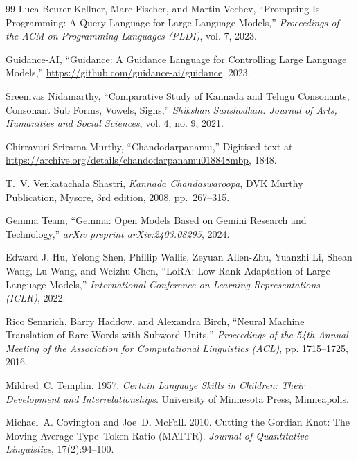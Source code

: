 \documentclass[11pt]{article}
\begin{document}
\begin{thebibliography}{99}
Luca Beurer-Kellner, Marc Fischer, and Martin Vechev, 
``Prompting Is Programming: A Query Language for Large Language Models,'' 
\textit{Proceedings of the ACM on Programming Languages (PLDI)}, vol. 7, 2023.

Guidance-AI, 
``Guidance: A Guidance Language for Controlling Large Language Models,'' 
\url{https://github.com/guidance-ai/guidance}, 2023.

Sreenivas Nidamarthy, 
``Comparative Study of {Kannada} and {Telugu} Consonants, Consonant Sub Forms, Vowels, Signs,'' 
\textit{Shikshan Sanshodhan: Journal of Arts, Humanities and Social Sciences}, vol. 4, no. 9, 2021.

Chirravuri Srirama Murthy,
``Chandodarpanamu,''
Digitised text at \url{https://archive.org/details/chandodarpanamu018848mbp}, 1848.

T.~V. Venkatachala Shastri,
\textit{Kannada Chandaswaroopa},
DVK Murthy Publication, Mysore, 3rd edition, 2008, pp.~267--315.

Gemma Team, 
``Gemma: Open Models Based on {Gemini} Research and Technology,'' 
\textit{arXiv preprint arXiv:2403.08295}, 2024.

Edward J. Hu, Yelong Shen, Phillip Wallis, Zeyuan Allen-Zhu, Yuanzhi Li, Shean Wang, Lu Wang, and Weizhu Chen, 
``{LoRA}: Low-Rank Adaptation of Large Language Models,'' 
\textit{International Conference on Learning Representations (ICLR)}, 2022.

Rico Sennrich, Barry Haddow, and Alexandra Birch,
``Neural Machine Translation of Rare Words with Subword Units,''
\textit{Proceedings of the 54th Annual Meeting of the Association for Computational Linguistics (ACL)}, pp. 1715--1725, 2016.

Mildred~C. Templin. 1957.
\newblock \textit{Certain Language Skills in Children: Their Development and Interrelationships}.
\newblock University of Minnesota Press, Minneapolis.

Michael~A. Covington and Joe~D. McFall. 2010.
\newblock Cutting the {G}ordian {K}not: The Moving-Average Type--Token Ratio ({MATTR}).
\newblock \textit{Journal of Quantitative Linguistics}, 17(2):94--100.


\end{thebibliography}
\end{document}

